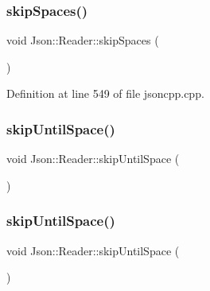 \hypertarget{class_json_1_1_reader_a40d0f69d15aeb2d52ff78d794f5ab8b2}{}\label{class_json_1_1_reader_a40d0f69d15aeb2d52ff78d794f5ab8b2} 
\subsubsection{\texorpdfstring{skip\+Spaces()}{skipSpaces()}\hspace{0.1cm}{\footnotesize\ttfamily [2/2]}}
{\footnotesize\ttfamily void Json\+::\+Reader\+::skip\+Spaces (\begin{DoxyParamCaption}{ }\end{DoxyParamCaption})\hspace{0.3cm}{\ttfamily [private]}}



Definition at line 549 of file jsoncpp.\+cpp.

\hypertarget{class_json_1_1_reader_ad922ea5a8ab333084edbb84827861fa3}{}\label{class_json_1_1_reader_ad922ea5a8ab333084edbb84827861fa3} 
\subsubsection{\texorpdfstring{skip\+Until\+Space()}{skipUntilSpace()}\hspace{0.1cm}{\footnotesize\ttfamily [1/2]}}
{\footnotesize\ttfamily void Json\+::\+Reader\+::skip\+Until\+Space (\begin{DoxyParamCaption}{ }\end{DoxyParamCaption})\hspace{0.3cm}{\ttfamily [private]}}

\hypertarget{class_json_1_1_reader_ad922ea5a8ab333084edbb84827861fa3}{}\label{class_json_1_1_reader_ad922ea5a8ab333084edbb84827861fa3} 
\subsubsection{\texorpdfstring{skip\+Until\+Space()}{skipUntilSpace()}\hspace{0.1cm}{\footnotesize\ttfamily [2/2]}}
{\footnotesize\ttfamily void Json\+::\+Reader\+::skip\+Until\+Space (\begin{DoxyParamCaption}{ }\end{DoxyParamCaption})\hspace{0.3cm}{\ttfamily [private]}}



